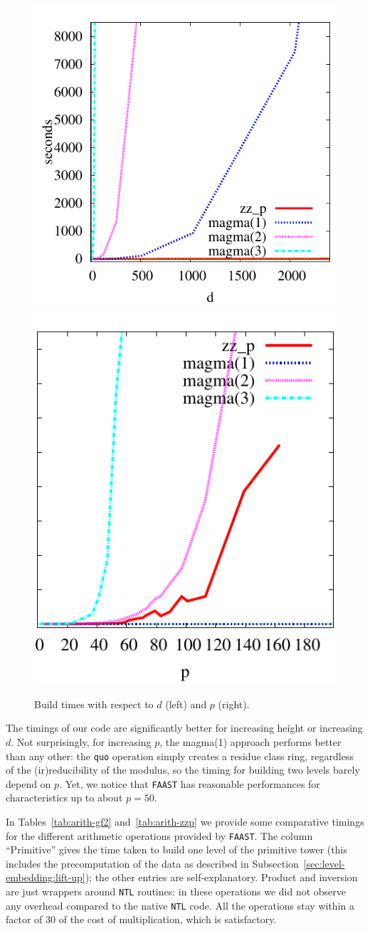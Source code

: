 \begin{figure}
  \centering
  \includegraphics[height=0.5\textwidth]{artin/build-d}
  \includegraphics[height=0.5\textwidth]{artin/build-p}
  
  \caption{Build times with respect to $d$ (left) and $p$ (right).}
  \label{fig:p-d}
\end{figure}

The timings of our code are significantly better for increasing height
or increasing $d$. Not surprisingly, for increasing $p$, the magma(1)
approach performs better than any other: the \texttt{quo} operation
simply creates a residue class ring, regardless of the
(ir)reducibility of the modulus, so the timing for building two levels
barely depend on $p$. Yet, we notice that \texttt{FAAST} has
reasonable performances for characteristics up to about $p=50$.

In Tables~\ref{tab:arith-gf2} and~\ref{tab:arith-zzp} we provide some
comparative timings for the different arithmetic operations provided
by \texttt{FAAST}. The column ``Primitive'' gives the time taken to
build one level of the primitive tower (this includes the
precomputation of the data as described in
Subsection~\ref{sec:level-embedding:lift-up}); the other entries are
self-explanatory. Product and inversion are just wrappers around
\texttt{NTL} routines: in these operations we did not observe any
overhead compared to the native \texttt{NTL} code. All the operations
stay within a factor of $30$ of the cost of multiplication, which is
satisfactory.

